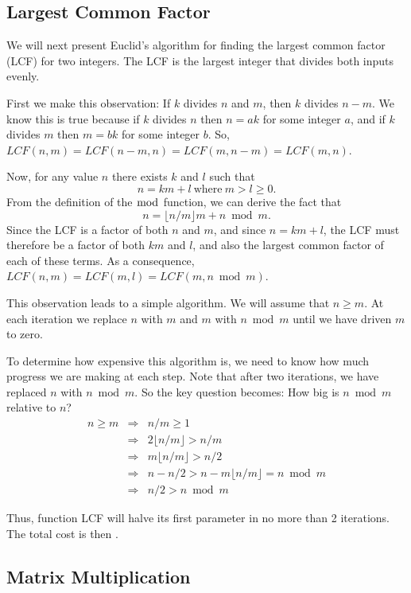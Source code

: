 \subsection{Largest Common Factor}

We will next present Euclid's algorithm for finding the largest common
factor (LCF) for two integers.
The LCF is the largest integer that divides both inputs evenly.

First we make this observation: If $k$ divides $n$ and $m$, then $k$
divides $n - m$.
We know this is true because if $k$ divides $n$ then $n = ak$ for some
integer $a$, and if $k$ divides $m$ then $m = bk$ for some integer $b$.
So, $LCF(n, m) = LCF(n-m, n) = LCF(m, n-m) = LCF(m, n)$.

Now, for any value $n$ there exists $k$ and $l$ such that
\[n = km + l\ \mbox{where}\ m > l \geq 0.\]
\noindent From the definition of the $\bmod$ function, we can derive
the fact that
\[n = \lfloor n/m \rfloor m + n \bmod m.\]
\noindent Since the LCF is a factor of both \(n\) and \(m\),
and since \(n = km + l\), the LCF must therefore be a factor of both
\(km\) and  \(l\), and also the largest common factor of each of these
terms.
As a consequence, $LCF(n, m) = LCF(m, l) = LCF(m, n \bmod m)$.

This observation leads to a simple algorithm.
We will assume that \(n \geq m\).
At each iteration we replace \(n\) with \(m\) and
\(m\) with \(n \bmod m\)
until we have driven \(m\) to zero.


To determine how expensive this algorithm is, we need to know how much
progress we are making at each step.
Note that after two iterations, we have replaced
\(n\) with \(n \bmod m\).
So the key question becomes:
How big is $n \bmod m$ relative to $n$?
\begin{eqnarray*}
n \geq m &\Rightarrow& n/m \geq 1\\
&\Rightarrow& 2\lfloor n/m\rfloor > n/m\\
&\Rightarrow& m\lfloor n/m\rfloor > n/2\\
&\Rightarrow& n - n/2 > n - m\lfloor n/m\rfloor = n \bmod m\\
&\Rightarrow& n/2 > n \bmod m
\end{eqnarray*}

Thus, function LCF will halve its first parameter in no more than 2
iterations.
The total cost is then \Ologn.

\subsection{Matrix Multiplication}
\label{Strassen}

